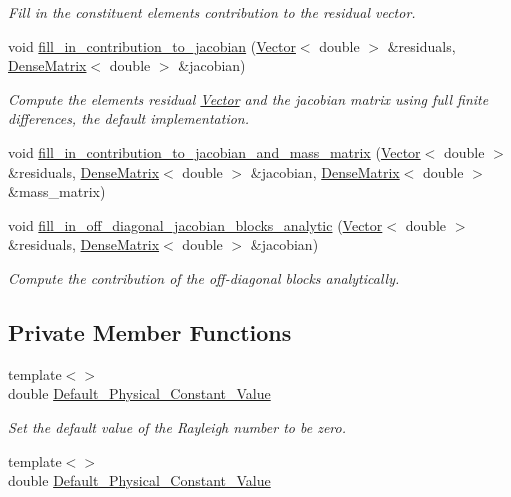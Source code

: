 \begin{DoxyCompactItemize}
\begin{DoxyCompactList}\small\item\em Fill in the constituent elements\textquotesingle{} contribution to the residual vector. \end{DoxyCompactList}\item 
void \hyperlink{classoomph_1_1RefineableBuoyantQCrouzeixRaviartElement_a0d05a727999c7f102f3fe2bacce38f6b}{fill\+\_\+in\+\_\+contribution\+\_\+to\+\_\+jacobian} (\hyperlink{classoomph_1_1Vector}{Vector}$<$ double $>$ \&residuals, \hyperlink{classoomph_1_1DenseMatrix}{Dense\+Matrix}$<$ double $>$ \&jacobian)
\begin{DoxyCompactList}\small\item\em Compute the element\textquotesingle{}s residual \hyperlink{classoomph_1_1Vector}{Vector} and the jacobian matrix using full finite differences, the default implementation. \end{DoxyCompactList}\item 
void \hyperlink{classoomph_1_1RefineableBuoyantQCrouzeixRaviartElement_a06f1e2dbdf7a8ebaa964d421aee453ee}{fill\+\_\+in\+\_\+contribution\+\_\+to\+\_\+jacobian\+\_\+and\+\_\+mass\+\_\+matrix} (\hyperlink{classoomph_1_1Vector}{Vector}$<$ double $>$ \&residuals, \hyperlink{classoomph_1_1DenseMatrix}{Dense\+Matrix}$<$ double $>$ \&jacobian, \hyperlink{classoomph_1_1DenseMatrix}{Dense\+Matrix}$<$ double $>$ \&mass\+\_\+matrix)
\item 
void \hyperlink{classoomph_1_1RefineableBuoyantQCrouzeixRaviartElement_a6fe93946149c696f273be12540099d1a}{fill\+\_\+in\+\_\+off\+\_\+diagonal\+\_\+jacobian\+\_\+blocks\+\_\+analytic} (\hyperlink{classoomph_1_1Vector}{Vector}$<$ double $>$ \&residuals, \hyperlink{classoomph_1_1DenseMatrix}{Dense\+Matrix}$<$ double $>$ \&jacobian)
\begin{DoxyCompactList}\small\item\em Compute the contribution of the off-\/diagonal blocks analytically. \end{DoxyCompactList}\end{DoxyCompactItemize}
\subsection*{Private Member Functions}
\begin{DoxyCompactItemize}
\item 
{\footnotesize template$<$$>$ }\\double \hyperlink{classoomph_1_1RefineableBuoyantQCrouzeixRaviartElement_ab36052eddfa043777414ce64470bb0a3}{Default\+\_\+\+Physical\+\_\+\+Constant\+\_\+\+Value}
\begin{DoxyCompactList}\small\item\em Set the default value of the Rayleigh number to be zero. \end{DoxyCompactList}\item 
{\footnotesize template$<$$>$ }\\double \hyperlink{classoomph_1_1RefineableBuoyantQCrouzeixRaviartElement_a4e22ae2489586ac69c1e5ebcb04e6343}{Default\+\_\+\+Physical\+\_\+\+Constant\+\_\+\+Value}
\end{DoxyCompactItemize}

